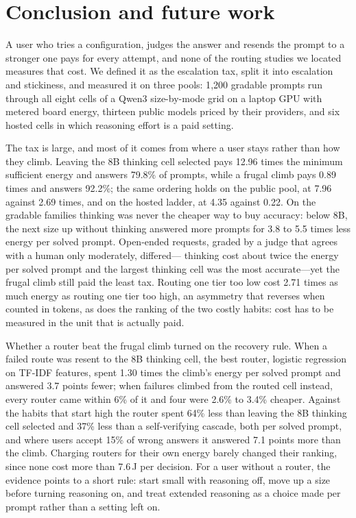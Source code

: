 \section{Conclusion and future work}
\label{sec:conclusion}

A user who tries a configuration, judges the answer and resends the prompt to
a stronger one pays for every attempt, and none of the routing studies we
located measures that cost. We defined it as the escalation tax, split it
into escalation and stickiness, and measured it on three pools: 1{,}200
gradable prompts run through all eight cells of a Qwen3 size-by-mode grid on
a laptop GPU with metered board energy, thirteen public models priced by
their providers, and six hosted cells in which reasoning effort is a paid
setting.

The tax is large, and most of it comes from where a user stays rather than
how they climb. Leaving the 8B thinking cell selected pays 12.96 times the
minimum sufficient energy and answers 79.8\% of prompts, while a frugal climb
pays 0.89 times and answers 92.2\%; the same ordering holds on the public
pool, at 7.96 against 2.69 times, and on the hosted ladder, at 4.35 against
0.22. On the gradable families thinking was never the cheaper way to buy
accuracy: below 8B, the next size up without thinking answered more prompts
for 3.8 to 5.5 times less energy per solved prompt. Open-ended requests,
graded by a judge that agrees with a human only moderately, differed---
thinking cost about twice the energy per solved prompt and the largest
thinking cell was the most accurate---yet the frugal climb still paid the
least tax. Routing one tier too low cost 2.71 times as much energy as routing
one tier too high, an asymmetry that reverses when counted in tokens, as does
the ranking of the two costly habits: cost has to be measured in the unit
that is actually paid.

Whether a router beat the frugal climb turned on the recovery rule. When a
failed route was resent to the 8B thinking cell, the best router, logistic
regression on TF-IDF features, spent 1.30 times the climb's energy per solved
prompt and answered 3.7 points fewer; when failures climbed from the routed
cell instead, every router came within 6\% of it and four were 2.6\% to 3.4\%
cheaper. Against the habits that start high the router spent 64\% less than
leaving the 8B thinking cell selected and 37\% less than a self-verifying
cascade, both per solved prompt, and where users accept 15\% of wrong answers
it answered 7.1 points more than the climb. Charging routers for their own
energy barely changed their ranking, since none cost more than 7.6\,J per
decision. For a user without a router, the evidence points to a short rule:
start small with reasoning off, move up a size before turning reasoning on,
and treat extended reasoning as a choice made per prompt rather than a
setting left on.

